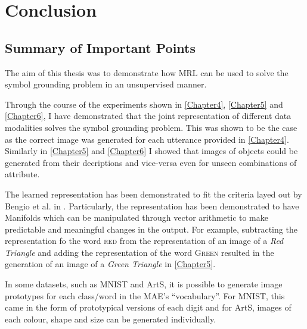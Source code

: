 
\chapter{Conclusion} %

\label{Chapter7} %



\section{Summary of Important Points}
The aim of this thesis was to demonstrate how \ac{MRL} can be used to solve the symbol grounding problem in an unsupervised manner.

Through the course of the experiments shown in \autoref{Chapter4}, \autoref{Chapter5} and \autoref{Chapter6}, I have demonstrated that the joint representation of different data modalities solves the symbol grounding problem. This was shown to be the case as the correct image was generated for each utterance provided in \autoref{Chapter4}. Similarly in \autoref{Chapter5} and \autoref{Chapter6} I showed that images of objects could be generated from their decriptions and vice-versa even for unseen combinations of attribute.

The learned representation has been demonstrated to fit the criteria layed out by Bengio et al. in \cite{repRev}. Particularly, the representation has been demonstrated to have Manifolds which can be manipulated through vector arithmetic to make predictable and meaningful changes in the output. For example, subtracting the representation fo the word \textsc{red} from the representation of an image of a \textit{Red Triangle} and adding the representation of the word \textsc{Green} resulted in the generation of an image of a \textit{Green Triangle} in \autoref{Chapter5}. 

In some datasets, such as MNIST and ArtS, it is possible to generate image prototypes for each class/word in the \ac{MAE}'s ``vocabulary''. For MNIST, this came in the form of prototypical versions of each digit and for ArtS, images of each colour, shape and size can be generated individually.

